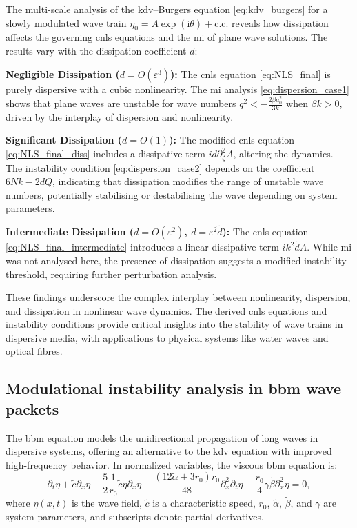 \documentclass[alpha-refs, 12pt]{wiley-article}
\newcommand{\ui}{\mathrm{i}}
\newcommand{\eps}{\varepsilon}
\begin{document}
The multi-scale analysis of the \acrshort{kdv}--Burgers equation \eqref{eq:kdv_burgers} for a slowly modulated wave train $\eta_0 = A \exp(\ui \theta) + \text{c.c.}$ reveals how dissipation affects the governing \acrfull{cnls} equations and the \acrshort{mi} of plane wave solutions. The results vary with the dissipation coefficient $d$:

\begin{description}
  \item{\textbf{Negligible Dissipation ($d = O(\eps^3)$):}} The \acrshort{cnls} equation \eqref{eq:NLS_final} is purely dispersive with a cubic nonlinearity. The \acrshort{mi} analysis \eqref{eq:dispersion_case1} shows that plane waves are unstable for wave numbers $q^2 < -\frac{2 \beta a_0^2}{3 k}$ when $\beta k > 0$, driven by the interplay of dispersion and nonlinearity.
  \item{\textbf{Significant Dissipation ($d = O(1)$):}} The modified \acrshort{cnls} equation \eqref{eq:NLS_final_diss} includes a dissipative term $i d \partial_\zeta^2 A$, altering the dynamics. The instability condition \eqref{eq:dispersion_case2} depends on the coefficient $6 N k - 2 d Q$, indicating that dissipation modifies the range of unstable wave numbers, potentially stabilising or destabilising the wave depending on system parameters.
  \item{\textbf{Intermediate Dissipation ($d = O(\eps^2)$, $d = \eps^2 \tilde{d}$):}} The \acrshort{cnls} equation \eqref{eq:NLS_final_intermediate} introduces a linear dissipative term $i k^2 \tilde{d} A$. While \acrshort{mi} was not analysed here, the presence of dissipation suggests a modified instability threshold, requiring further perturbation analysis.
\end{description}
These findings underscore the complex interplay between nonlinearity, dispersion, and dissipation in nonlinear wave dynamics. The derived \acrshort{cnls} equations and instability conditions provide critical insights into the stability of wave trains in dispersive media, with applications to physical systems like water waves and optical fibres.

\subsection{Modulational instability analysis in \acrshort{bbm} wave packets}

The \acrfull{bbm} equation models the unidirectional propagation of long waves in dispersive systems, offering an alternative to the \acrfull{kdv} equation with improved high-frequency behavior. In normalized variables, the viscous \acrshort{bbm} equation is:
\begin{equation}\label{eq:BBM1}
  \partial_t \eta + \tilde{c} \partial_x \eta + \frac{5}{2} \frac{1}{r_0} \tilde{c} \eta \partial_x \eta - \frac{(12 \tilde{\alpha} + 3 r_0) r_0}{48} \partial_x^2 \partial_t \eta - \frac{r_0}{4} \gamma \tilde{\beta} \partial_x^2 \eta = 0,
\end{equation}
where $\eta(x,t)$ is the wave field, $\tilde{c}$ is a characteristic speed, $r_0$, $\tilde{\alpha}$, $\tilde{\beta}$, and $\gamma$ are system parameters, and subscripts denote partial derivatives.
\end{document}
